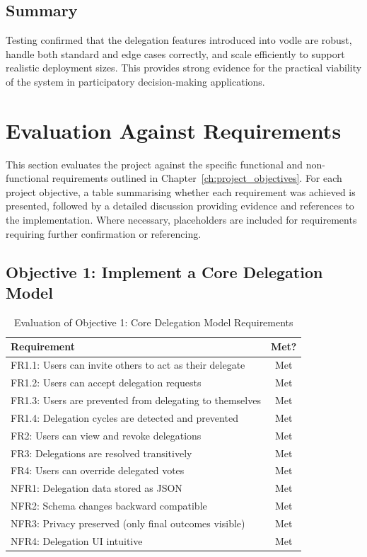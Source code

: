 \subsection*{Summary}
Testing confirmed that the delegation features introduced into vodle are robust, handle both standard and edge cases correctly, and scale efficiently to support realistic deployment sizes. This provides strong evidence for the practical viability of the system in participatory decision-making applications.


\section{Evaluation Against Requirements}

This section evaluates the project against the specific functional and non-functional requirements outlined in Chapter~\ref{ch:project_objectives}. For each project objective, a table summarising whether each requirement was achieved is presented, followed by a detailed discussion providing evidence and references to the implementation. Where necessary, placeholders are included for requirements requiring further confirmation or referencing.

\subsection{Objective 1: Implement a Core Delegation Model}

\begin{table}[H]
\centering
\begin{tabular}{|p{9cm}|c|}
\hline
\textbf{Requirement} & \textbf{Met?} \\ \hline
FR1.1: Users can invite others to act as their delegate & Met \\ \hline
FR1.2: Users can accept delegation requests & Met \\ \hline
FR1.3: Users are prevented from delegating to themselves & Met \\ \hline
FR1.4: Delegation cycles are detected and prevented & Met \\ \hline
FR2: Users can view and revoke delegations & Met \\ \hline
FR3: Delegations are resolved transitively & Met \\ \hline
FR4: Users can override delegated votes & Met \\ \hline
NFR1: Delegation data stored as JSON & Met \\ \hline
NFR2: Schema changes backward compatible & Met \\ \hline
NFR3: Privacy preserved (only final outcomes visible) & Met \\ \hline
NFR4: Delegation UI intuitive & Met \\ \hline
\end{tabular}
\caption{Evaluation of Objective 1: Core Delegation Model Requirements}
\label{tab:objective1_requirements}
\end{table}

